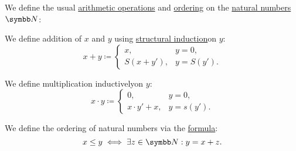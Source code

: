 \begin{definition}\label{def:natural_numbers_structure}
  We define the usual \hyperref[def:algebraic_theory]{arithmetic operations} and \hyperref[remark:order_infix_notation]{ordering} on the \hyperref[def:natural_numbers]{natural numbers} \( \BN \):
  \begin{DefEnum}
     We define addition of \( x \) and \( y \) using \hyperref[remark:induction]{structural induction}\IND on \( y \):
    \begin{equation*}
      x + y \coloneqq \begin{cases}
        x,         & y = 0,     \\
        S(x + y'), & y = S(y').
      \end{cases}
    \end{equation*}

     We define multiplication inductively\IND on \( y \):
    \begin{equation*}
      x \cdot y \coloneqq \begin{cases}
        0,              & y = 0,     \\
        x \cdot y' + x, & y = s(y').
      \end{cases}
    \end{equation*}

     We define the ordering of natural numbers via the \hyperref[def:first_order_formula]{formula}:
    \begin{equation*}
      x \leq y \iff \exists z \in \BN: y = x + z.
    \end{equation*}
  \end{DefEnum}
\end{definition}

